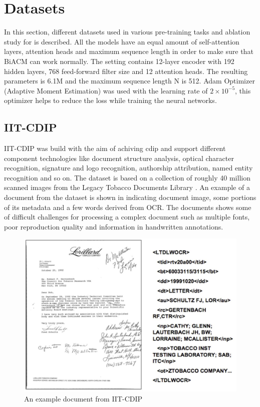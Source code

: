 \section{Datasets\label{datasets}}
In this section, different datasets used in various pre-training tasks and ablation study for \cite{wang-etal-2022-lilt} is described. All the models have an equal amount of self-attention layers, attention heads and maximum sequence length in order to make sure that BiACM can work normally. The   setting contains 12-layer encoder with 192 hidden layers, 768 feed-forward filter size and 12 attention heads. The resulting parameters is 6.1M and the maximum sequence length N is 512. Adam Optimizer (Adaptive Moment Estimation) \cite{loshchilov2017decoupled} was used with the learning rate of $2\times10^{-5}$, this optimizer helps to reduce the loss while training the neural networks.



\subsection{IIT-CDIP}
IIT-CDIP \cite{lewis2006building} was build with the aim of achiving \acrfull{cdip} and support different component technologies like document structure analysis, optical character recognition, signature and logo recognition, authorship attribution, named entity recognition and so on. The dataset is based on a collection of roughly 40 million scanned images from the Legacy Tobacco Documents Library \cite{schmidt2002building}. An example of a document from the dataset is shown in  indicating document image, some portions of its metadata and a few words derived from OCR. The documents shows some of difficult challenges for processing a complex document such as multiple fonts, poor reproduction quality and information in handwritten annotations.  

\begin{figure}[ht]
    \centering
    \includegraphics[width=0.7 \textwidth]{chapters/images/Methods/Datasets/IIT-CDIP.JPG}
    \caption{An example document from IIT-CDIP \cite{lewis2006building}}
    \label{fig:IIT-CDIP}
\end{figure}


